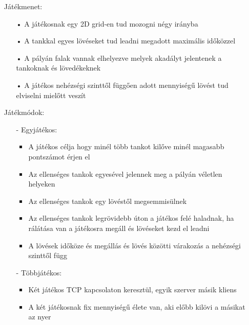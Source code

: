 \documentclass[12pt]{article}
\begin{document}
\begin{itemize}

\item[] Játékmenet:

\begin{itemize}
\item[•] A játékosnak egy 2D grid-en tud mozogni négy irányba
\item[•] A tankkal egyes lövéseket tud leadni megadott maximális időközzel
\item[•] A pályán falak vannak elhelyezve melyek akadályt jelentenek a tankoknak és lövedékeknek
\item[•] A játékos nehézségi szinttől függően adott mennyiségű lövést tud elviselni mielőtt veszít
\end{itemize}

\item[] Játékmódok:

\begin{itemize}

\item[-] Egyjátékos:
\begin{itemize}
\item A játékos célja hogy minél több tankot kilőve minél magasabb pontszámot érjen el
\item Az ellenséges tankok egyesével jelennek meg a pályán véletlen helyeken
\item Az ellenséges tankok egy lövéstől megsemmisülnek
\item Az ellenséges tankok legrövidebb úton a játékos felé haladnak, ha rálátása van a játékosra megáll és lövéseket kezd el leadni
\item A lövések időköze és megállás és lövés közötti várakozás a nehézségi szinttől függ
\end{itemize}
\item[-] Többjátékos:
\begin{itemize}
\item Két játékos TCP kapcsolaton keresztül, egyik szerver másik kliens
\item A két játékosnak fix mennyiségű élete van, aki előbb kilövi a másikat az nyer
\end{itemize}

\end{itemize}

\end{itemize}
\end{document}
